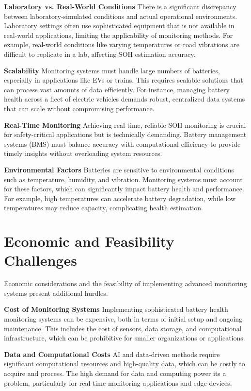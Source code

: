 \textbf{Laboratory vs. Real-World Conditions}
There is a significant discrepancy between laboratory-simulated conditions and actual operational environments. 
Laboratory settings often use sophisticated equipment that is not available in real-world applications, limiting the applicability of monitoring methods. For example, real-world conditions like varying temperatures or road vibrations are difficult to replicate in a lab, affecting SOH estimation accuracy.

\textbf{Scalability}
Monitoring systems must handle large numbers of batteries, especially in applications like EVs or trains. 
This requires scalable solutions that can process vast amounts of data efficiently. 
For instance, managing battery health across a fleet of electric vehicles demands robust, centralized data systems that can scale without compromising performance.

\textbf{Real-Time Monitoring}
Achieving real-time, reliable SOH monitoring is crucial for safety-critical applications but is technically demanding. 
Battery management systems (BMS) must balance accuracy with computational efficiency to provide timely insights without overloading system resources.

\textbf{Environmental Factors}
Batteries are sensitive to environmental conditions such as temperature, humidity, and vibration. 
Monitoring systems must account for these factors, which can significantly impact battery health and performance. 
For example, high temperatures can accelerate battery degradation, while low temperatures may reduce capacity, complicating health estimation.

\section{Economic and Feasibility Challenges}
Economic considerations and the feasibility of implementing advanced monitoring systems present additional hurdles.

\textbf{Cost of Monitoring Systems}
Implementing sophisticated battery health monitoring systems can be expensive, both in terms of initial setup and ongoing maintenance. 
This includes the cost of sensors, data storage, and computational infrastructure, which can be prohibitive for smaller organizations or applications.

\textbf{Data and Computational Costs}
AI and data-driven methods require significant computational resources and high-quality data, which can be costly to acquire and process. 
The high demand for data and computing power its a problem, particularly for real-time monitoring applications and edge devices.

